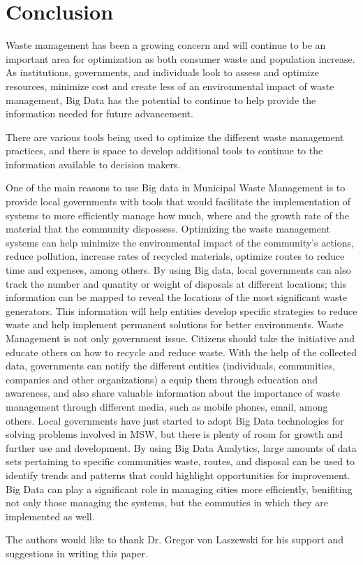 \documentclass[sigconf]{acmart}
\begin{document}
\section{Conclusion}
Waste management has been a growing concern and will continue to be an important area for optimization as both consumer waste and population increase.  As institutions, governments, and individuals look to assess and optimize resources, minimize cost and create less of an environmental impact of waste management, Big Data has the potential to continue to help provide the information needed for future advancement.

There are various tools being used to optimize the different waste management practices, and there is space to develop additional tools to continue to the information available to decision makers.

One of the main reasons to use Big data in Municipal Waste Management is to provide local governments with tools that would facilitate the implementation of systems to more efficiently manage how much, where and the growth rate of the material that the community dispossess. Optimizing the waste management systems can help minimize the environmental impact of the community's actions, reduce pollution, increase rates of recycled materials, optimize routes to reduce time and expenses, among others.
By using Big data, local governments can also track the number and quantity or weight of disposals at different locations; this information can be mapped to reveal the locations of the most significant waste generators.  This information will help entities develop specific strategies to reduce waste and help implement permanent solutions for better environments. 
Waste Management is not only government issue. Citizens should take the initiative and educate others on how to recycle and reduce waste. With the help of the collected data, governments can notify the different entities (individuals, communities, companies and other organizations) a equip them through education and awareness, and also share valuable information about the importance of waste management through different media, such as mobile phones, email, among others.
Local governments have just started to adopt Big Data technologies for solving problems involved in MSW, but there is plenty of room for growth and further use and development.  By using Big Data Analytics, large amounts of data sets pertaining to specific communities waste, routes, and disposal can be used to identify trends and patterns that could highlight opportunities for improvement. Big Data can play a significant role in managing cities more efficiently, benifiting not only those managing the systems, but the commuties in which they are implemented as well.
\begin{acks}

The authors would like to thank Dr. Gregor von Laszewski for his support and suggestions in writing this paper.

\end{acks}

 
\end{document}

